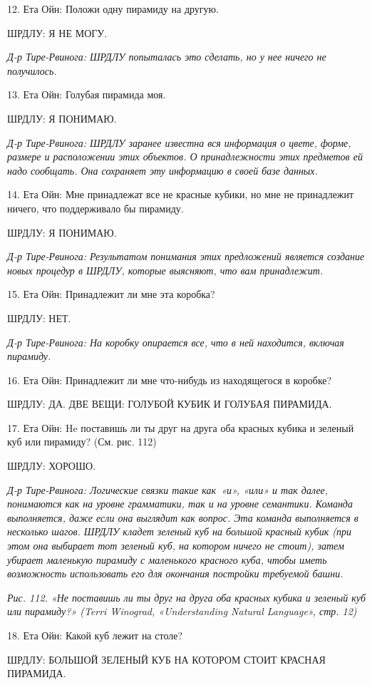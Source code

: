 \documentclass[../main.tex]{subfiles}
\begin{document}
\begin{dialogue}
12. Ета Ойн: Положи одну пирамиду на другую.

ШРДЛУ: Я НЕ МОГУ.

\emph{Д-р Тире-Рвинога: ШРДЛУ попыталась это сделать, но у нее ничего не получилось.}

13. Ета Ойн: Голубая пирамида моя.

ШРДЛУ: Я ПОНИМАЮ.

\emph{Д-р Тире-Рвинога: ШРДЛУ заранее известна вся информация о цвете, форме, размере и расположении этих объектов. О принадлежности этих предметов ей надо сообщать. Она сохраняет эту информацию в своей базе данных.}

14. Ета Ойн: Мне принадлежат все не красные кубики, но мне не принадлежит ничего, что поддерживало бы пирамиду.

ШРДЛУ: Я ПОНИМАЮ.

\emph{Д-р Тире-Рвинога: Результатом понимания этих предложений является создание новых процедур в ШРДЛУ, которые выясняют, что вам принадлежит.}

15. Ета Ойн: Принадлежит ли мне эта коробка?

ШРДЛУ: НЕТ.

\emph{Д-р Тире-Рвинога: На коробку опирается все, что в ней находится, включая пирамиду.}

16. Ета Ойн: Принадлежит ли мне что-нибудь из находящегося в коробке?

ШРДЛУ: ДА. ДВЕ ВЕЩИ: ГОЛУБОЙ КУБИК И ГОЛУБАЯ ПИРАМИДА.

17. Ета Ойн: He поставишь ли ты друг на друга оба красных кубика и зеленый куб или пирамиду? (См. рис. 112)

ШРДЛУ: ХОРОШО.

\emph{Д-р Тире-Рвинога: Логические связки такие как~«и», «или» и так далее, понимаются как на уровне грамматики, так и на уровне семантики. Команда выполняется, даже если она выглядит как вопрос. Эта команда выполняется в несколько шагов. ШРДЛУ кладет зеленый куб на большой красный кубик (при этом она выбирает тот зеленый куб, на котором ничего не стоит), затем убирает маленькую пирамиду с маленького красного куба, чтобы иметь возможность использовать его для окончания постройки требуемой башни.}

\emph{Рис. 112. «Не поставишь ли ты друг на друга оба красных кубика и зеленый куб или пирамиду?» (Terri Winograd, «Understanding Natural Language», стр. 12)}

18. Ета Ойн: Какой куб лежит на столе?

ШРДЛУ: БОЛЬШОЙ ЗЕЛЕНЫЙ КУБ НА КОТОРОМ СТОИТ КРАСНАЯ ПИРАМИДА.


\end{dialogue}
\end{document}
